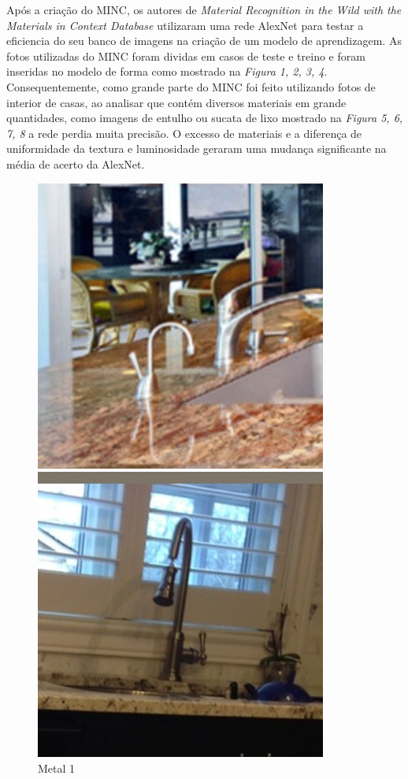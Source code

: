 \documentclass[conference, compsoc, 12pt]{IEEEtran}
\begin{document}
Após a criação do MINC, os autores de \emph{Material Recognition in the Wild with the Materials in Context Database} utilizaram uma rede AlexNet
\cite{Artigo principal} para testar a eficiencia do seu banco de imagens na criação de um modelo de aprendizagem.
As fotos utilizadas do MINC foram dividas em casos de teste e treino e foram inseridas no modelo de forma como mostrado na \emph{Figura 1, 2, 3, 4}.
Consequentemente, como grande parte do MINC foi feito utilizando fotos de interior de casas, ao analisar que contém diversos materiais em grande quantidades,
como imagens de entulho ou sucata de lixo mostrado na \emph{Figura 5, 6, 7, 8} a rede perdia muita precisão. O excesso de materiais e a diferença de uniformidade
da textura e luminosidade geraram uma mudança significante na média de acerto da AlexNet.

\begin{figure}[ht]
  \label{fig2}
  \begin{minipage}[b]{0.5\linewidth}
    \centering
    \includegraphics[width=.8\linewidth]{metal_000001.jpg}
    \caption{Metal 1}
    \vspace{4ex}
  \end{minipage}%
  \begin{minipage}[b]{0.5\linewidth}
    \centering
    \includegraphics[width=.8\linewidth]{metal_000012.jpg}

\end{minipage}
\end{figure}
\end{document}
